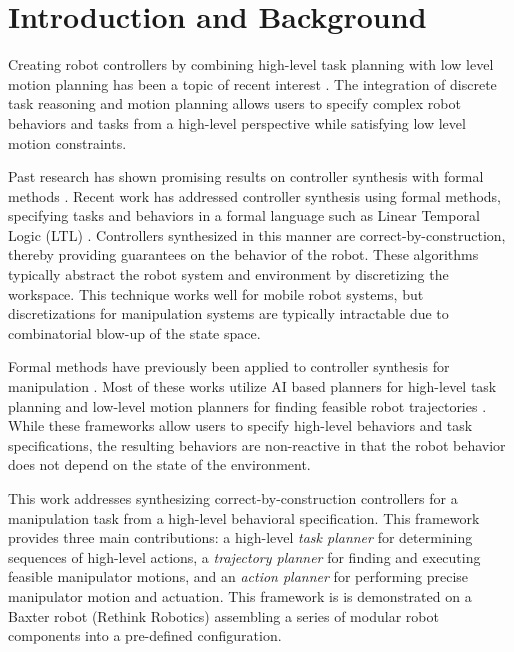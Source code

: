 \section{Introduction and Background}


Creating robot controllers by combining high-level task planning with low level motion planning has been a topic of recent interest \cite{HKG2009,Belta2008,Bhatia2011,Dornhege2009,Erdem2011,Tom2014,Srivastava2014}.
The integration of discrete task reasoning and motion planning allows users to specify complex robot behaviors and tasks from a high-level perspective while satisfying low level motion constraints.


Past research has shown promising results on controller synthesis with formal methods \cite{HKG2009,Belta2008,Bhatia2011,Wongpiromsarn,Maly,Vasile}.
Recent work has addressed controller synthesis using formal methods, specifying tasks and behaviors in a formal language such as Linear Temporal Logic (LTL) \cite{HKG2009,Belta2008,Bhatia2011,Dornhege2009,Erdem2011,Tom2014,Srivastava2014}.
Controllers synthesized in this manner are correct-by-construction, thereby providing guarantees on the behavior of the robot.
These algorithms typically abstract the robot system and environment by discretizing the workspace.
This technique works well for mobile robot systems, but discretizations for manipulation systems are typically intractable due to combinatorial blow-up of the state space.

Formal methods have previously been applied to controller synthesis for manipulation \cite{Dornhege2009,Erdem2011,Tom2014,Srivastava2014,CambonAG09,KaelblingL11,PlakuH10,HeLKV15}.
Most of these works utilize AI based planners for high-level task planning and low-level motion planners for finding feasible robot trajectories \cite{Nau,Hoffmann01}.
While these frameworks allow users to specify high-level behaviors and task specifications, the resulting behaviors are non-reactive in that the robot behavior does not depend on the state of the environment.

This work addresses synthesizing correct-by-construction controllers for a manipulation task from a high-level behavioral specification.
This framework provides three main contributions: a high-level {\it task planner} for determining sequences of high-level actions, a {\it trajectory planner} for finding and executing feasible manipulator motions, and an {\it action planner} for performing precise manipulator motion and actuation.
This framework is is demonstrated on a Baxter robot (Rethink Robotics) assembling a series of modular robot components into a pre-defined configuration. 


